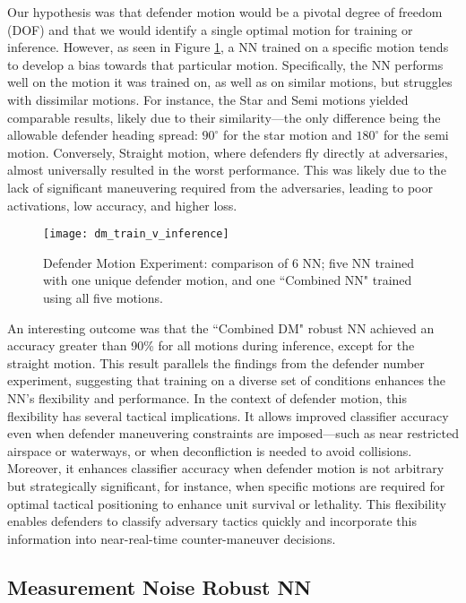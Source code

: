 \documentclass[journal]{IEEEtran} %
\begin{document}
Our hypothesis was that defender motion would be a pivotal degree of freedom (DOF) and that we would identify a single optimal motion for training or inference. However, as seen in Figure \ref{fig:dm_train_v_inference}, a NN trained on a specific motion tends to develop a bias towards that particular motion. Specifically, the NN performs well on the motion it was trained on, as well as on similar motions, but struggles with dissimilar motions. For instance, the Star and Semi motions yielded comparable results, likely due to their similarity—the only difference being the allowable defender heading spread: $90^\circ$ for the star motion and $180^\circ$ for the semi motion. Conversely, Straight motion, where defenders fly directly at adversaries, almost universally resulted in the worst performance. This was likely due to the lack of significant maneuvering required from the adversaries, leading to poor activations, low accuracy, and higher loss.

\begin{figure}[h]
    \centering
    \texttt{[image: dm\_train\_v\_inference]}
    \caption{Defender Motion Experiment: comparison of 6 NN; five NN trained with one unique defender motion, and one ``Combined NN" trained using all five motions.}
    \label{fig:dm_train_v_inference}
\end{figure}

An interesting outcome was that the ``Combined DM" robust NN achieved an accuracy greater than 90\% for all motions during inference, except for the straight motion. This result parallels the findings from the defender number experiment, suggesting that training on a diverse set of conditions enhances the NN's flexibility and performance. In the context of defender motion, this flexibility has several tactical implications. It allows improved classifier accuracy even when defender maneuvering constraints are imposed—such as near restricted airspace or waterways, or when deconfliction is needed to avoid collisions. Moreover, it enhances classifier accuracy when defender motion is not arbitrary but strategically significant, for instance, when specific motions are required for optimal tactical positioning to enhance unit survival or lethality. This flexibility enables defenders to classify adversary tactics quickly and incorporate this information into near-real-time counter-maneuver decisions.


\subsection{Measurement Noise Robust NN}
\end{document}
